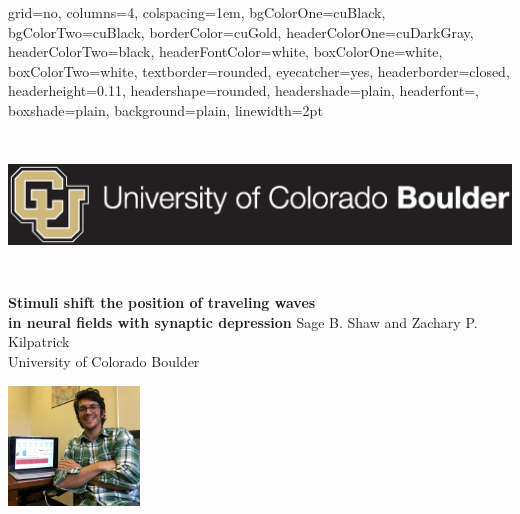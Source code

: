 \documentclass[landscape,final]{baposter}
\newcommand{\headshotsize}{1.25in}
\begin{document}
\begin{poster}{
	grid=no,
	columns=4,
	colspacing=1em,
	bgColorOne=cuBlack,
	bgColorTwo=cuBlack,
	borderColor=cuGold,
	headerColorOne=cuDarkGray,
	headerColorTwo=black,
	headerFontColor=white,
	boxColorOne=white,
	boxColorTwo=white,
	textborder=rounded,
	eyecatcher=yes,
	headerborder=closed,
	headerheight=0.11\textheight,
	headershape=rounded,
	headershade=plain,
	headerfont=\Large\textsf, %
	boxshade=plain,
	background=plain,
	linewidth=2pt
}
{{\begin{minipage}{4.5in}
\includegraphics[height=10em]{cu_logo}
\end{minipage}}} %
{
	\bf \huge
	\color{cuGold}
	Stimuli shift the position of traveling waves \\in neural fields with synaptic depression
	\vspace{1mm}
}
{\sc\large 
\color{cuGold}
	Sage B. Shaw and Zachary P. Kilpatrick\\ University of Colorado Boulder
}
{{\begin{minipage}{4.5in}
\includegraphics[height=\headshotsize, trim={5.1cm, 6cm, 2cm, 0cm}, clip=true]{headshot_zack}

\end{minipage}}}
\end{poster}
\end{document}
